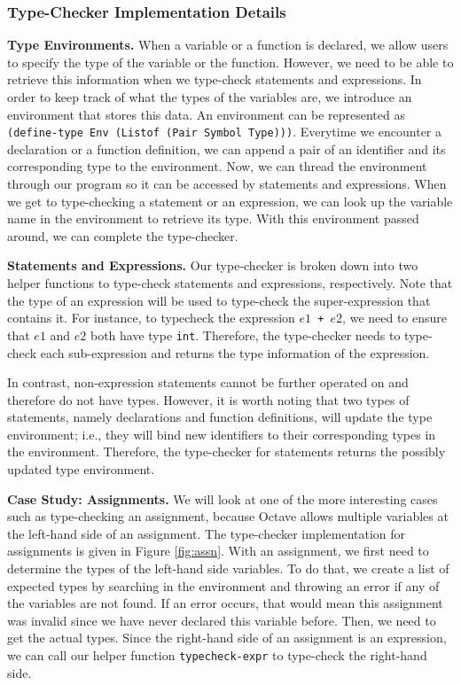 \subsubsection{Type-Checker Implementation Details}
{\bf Type Environments.} When a variable or a function is declared, we allow users to specify the type of the variable or the function. However, we need to be able to retrieve this information when we type-check statements and expressions. In order to keep track of what the types of the variables are, we introduce an environment that stores this data. An environment can be represented as {\tt (define-type Env (Listof (Pair Symbol Type)))}. Everytime we encounter a declaration or a function definition, we can append a pair of an identifier and its corresponding type to the environment. Now, we can thread the environment through our program so it can be accessed by statements and expressions. When we get to type-checking a statement or an expression, we can look up the variable name in the environment to retrieve its type. With this environment passed around, we can complete the type-checker. 

{\bf Statements and Expressions.} Our type-checker is broken down into two helper functions to type-check statements and expressions, respectively. Note that the type of an expression will be used to type-check the super-expression that contains it. For instance, to typecheck the expression {\tt $e1$ + $e2$}, we need to ensure that $e1$ and $e2$ both have type {\tt int}. Therefore, the type-checker needs to type-check each sub-expression and returns the type information of the expression.

In contrast, non-expression statements cannot be further operated on and therefore do not have types. However, it is worth noting that two types of statements, namely declarations and function definitions, will update the type environment; i.e., they will bind new identifiers to their corresponding types in the environment. Therefore, the type-checker for statements returns the possibly updated type environment.

{\bf Case Study: Assignments.} We will look at one of the more interesting cases such as type-checking an assignment, because Octave allows multiple variables at the left-hand side of an assignment. The type-checker implementation for assignments is given in Figure \ref{fig:assn}. With an assignment, we first need to determine the types of the left-hand side variables. To do that, we create a list of expected types by searching in the environment and throwing an error if any of the variables are not found. If an error occurs, that would mean this assignment was invalid since we have never declared this variable before. Then, we need to get the actual types. Since the right-hand side of an assignment is an expression, we can call our helper function {\tt typecheck-expr} to type-check the right-hand side.


